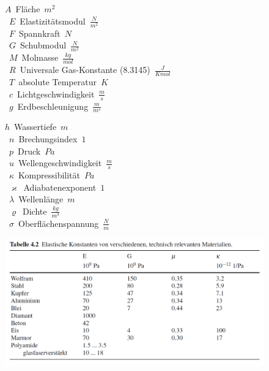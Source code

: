 \begin{center}
	\begin{minipage}{0.3\textwidth}
		\unit{$A$}{Fläche}{$m^2$} \\
		\unit{$E$}{Elastizitätsmodul}{$\frac{N}{m^2}$} \\
		\unit{$F$}{Spannkraft}{$N$} \\
		\unit{$G$}{Schubmodul}{$\frac{N}{m^2}$} \\
		\unit{$M$}{Molmasse}{$\frac{kg}{mol}$} \\
		\unit{$R$}{Universale Gas-Konstante (8.3145)}{$\frac{J}{K mol}$} \\
		\unit{$T$}{absolute Temperatur}{$K$} \\
		\unit{$c$}{Lichtgeschwindigkeit}{$\frac{m}{s}$} \\
		\unit{$g$}{Erdbeschleunigung}{$\frac{m}{m^s}$}
	\end{minipage}%
	\begin{minipage}{0.3\textwidth}
		\unit{$h$}{Wassertiefe}{$m$} \\
		\unit{$n$}{Brechungsindex}{$1$} \\
		\unit{$p$}{Druck}{$Pa$} \\
		\unit{$u$}{Wellengeschwindigkeit}{$\frac{m}{s}$} \\
		\unit{$\kappa$}{Kompressibilität}{$Pa$} \\
		\unit{$\varkappa$}{Adiabatenexponent}{$1$} \\
		\unit{$\lambda$}{Wellenlänge}{$m$} \\
		\unit{$\varrho$}{Dichte}{$\frac{kg}{m^3}$} \\
		\unit{$\sigma$}{Oberflächenspannung}{$\frac{N}{m}$}
	\end{minipage}
\end{center}

\begin{center}
	\includegraphics[height=5.5cm,keepaspectratio=true]{Images/elastische_konstanten.png}
\end{center}




